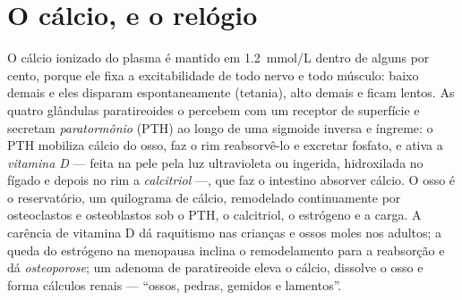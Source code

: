 \section{O cálcio, e o relógio}

\begin{definition}\label{def:b3:endocrinology:calcium}
O cálcio ionizado do plasma é mantido em \qty{1.2}{mmol/L} dentro de
alguns por cento, porque ele fixa a excitabilidade de todo nervo e todo
músculo: baixo demais e eles disparam espontaneamente (tetania), alto
demais e ficam lentos. As quatro glândulas paratireoides o percebem com
um receptor de superfície e secretam \emph{paratormônio} (PTH) ao longo
de uma sigmoide inversa e íngreme: o PTH mobiliza cálcio do osso, faz o
rim reabsorvê-lo e excretar fosfato, e ativa a \emph{vitamina D} ---
feita na pele pela luz ultravioleta ou ingerida, hidroxilada no fígado e
depois no rim a \emph{calcitriol} ---, que faz o intestino absorver
cálcio. O osso é o reservatório, um quilograma de cálcio, remodelado
continuamente por osteoclastos e osteoblastos sob o PTH, o calcitriol, o
estrógeno e a carga. A carência de vitamina D dá raquitismo nas crianças
e ossos moles nos adultos; a queda do estrógeno na menopausa inclina o
remodelamento para a reabsorção e dá \emph{osteoporose}; um adenoma de
paratireoide eleva o cálcio, dissolve o osso e forma cálculos renais ---
``ossos, pedras, gemidos e lamentos''.
\end{definition}

